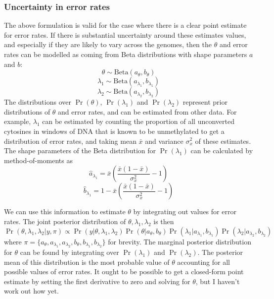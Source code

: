 \documentclass[12pt,longbibliography]{article}
\begin{document}
\subsubsection{Uncertainty in error rates}

The above formulation is valid for the case where there is a clear point estimate for error rates.
If there is substantial uncertainty around these estimates values, and especially if they are likely to vary across the genomes, then the $\theta$ and error rates can be modelled as coming from Beta distributions with shape parameters $a$ and $b$:
\begin{equation}
    \theta \sim \textrm{Beta}(a_{\theta}, b_{\theta})
\end{equation}
\begin{equation}
    \lambda_1 \sim \textrm{Beta}(a_{\lambda_1}, b_{\lambda_1})
\end{equation}
\begin{equation}
    \lambda_2 \sim \textrm{Beta}(a_{\lambda_2}, b_{\lambda_2})
\end{equation}
The distributions over $\Pr(\theta)$, $\Pr(\lambda_1)$ and $\Pr(\lambda_2)$ represent prior distributions of $\theta$ and error rates, and can be estimated from other data.
For example, $\lambda_1$ can be estimated by counting the proportion of all unconverted cytosines in windows of DNA that is known to be unmethylated to get a distribution of error rates, and taking mean $\bar{x}$ and variance $\sigma^2_x$ of these estimates.
The shape parameters of the Beta distribution for $\Pr(\lambda_1)$ can be calculated by method-of-moments as
\begin{equation}
    \hat{a}_{\lambda_1} = \bar{x}(\frac{\bar{x}(1-\bar{x})}{\sigma^2_x}-1)
\end{equation}
\begin{equation}
    \hat{b}_{\lambda_1} = 1-\bar{x}(\frac{\bar{x}(1-\bar{x})}{\sigma^2_x}-1) 
\end{equation}

We can use this information to estimate $\theta$ by integrating out values for error rates.
The joint posterior distribution of $\theta, \lambda_1, \lambda_2$ is then
\begin{equation}
    \Pr(\theta, \lambda_1, \lambda_2 | y, \pi)
    \propto 
    \Pr(y | \theta, \lambda_1, \lambda_2)
    \Pr(\theta | a_{\theta}, b_{\theta})
    \Pr(\lambda_1 | a_{\lambda_1}, b_{\lambda_1})
    \Pr(\lambda_2 | a_{\lambda_2}, b_{\lambda_2})
\end{equation}
where $\pi=\{a_{\theta}, a_{\lambda_1}, a_{\lambda_2}, b_{\theta}, b_{\lambda_1}, b_{\lambda_2}\}$ for brevity.
The marginal posterior distribution for $\theta$ can be found by integrating over $\Pr(\lambda_1)$ and $\Pr(\lambda_2)$.
The posterior mean of this distribution is the most probable value of $\theta$ accounting for all possible values of error rates. It ought to be possible to get a closed-form point estimate by setting the first derivative to zero and solving for $\theta$, but I haven't work out how yet.
\end{document}
